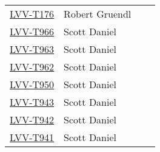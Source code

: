 \documentclass[DM,lsstdraft,STR,toc]{lsstdoc}
\begin{document}
\begin{longtable}{p{3cm}p{3cm}p{3cm}p{6cm}}
\begin{minipage}[]{6cm}
\medskip
\end{minipage}
\\ \hline
\href{https://jira.lsstcorp.org/secure/Tests.jspa#/testCase/LVV-T176}{LVV-T176}
& {\small Robert Gruendl } & {\small  } &
\begin{minipage}[]{6cm}
\smallskip
{\small  }
\medskip
\end{minipage}
\\ \hline
\href{https://jira.lsstcorp.org/secure/Tests.jspa#/testCase/LVV-T966}{LVV-T966}
& {\small Scott Daniel } & {\small  } &
\begin{minipage}[]{6cm}
\smallskip
{\small  }
\medskip
\end{minipage}
\\ \hline
\href{https://jira.lsstcorp.org/secure/Tests.jspa#/testCase/LVV-T963}{LVV-T963}
& {\small Scott Daniel } & {\small  } &
\begin{minipage}[]{6cm}
\smallskip
{\small  }
\medskip
\end{minipage}
\\ \hline
\href{https://jira.lsstcorp.org/secure/Tests.jspa#/testCase/LVV-T962}{LVV-T962}
& {\small Scott Daniel } & {\small  } &
\begin{minipage}[]{6cm}
\smallskip
{\small  }
\medskip
\end{minipage}
\\ \hline
\href{https://jira.lsstcorp.org/secure/Tests.jspa#/testCase/LVV-T950}{LVV-T950}
& {\small Scott Daniel } & {\small  } &
\begin{minipage}[]{6cm}
\smallskip
{\small  }
\medskip
\end{minipage}
\\ \hline
\href{https://jira.lsstcorp.org/secure/Tests.jspa#/testCase/LVV-T943}{LVV-T943}
& {\small Scott Daniel } & {\small  } &
\begin{minipage}[]{6cm}
\smallskip
{\small  }
\medskip
\end{minipage}
\\ \hline
\href{https://jira.lsstcorp.org/secure/Tests.jspa#/testCase/LVV-T942}{LVV-T942}
& {\small Scott Daniel } & {\small  } &
\begin{minipage}[]{6cm}
\smallskip
{\small  }
\medskip
\end{minipage}
\\ \hline
\href{https://jira.lsstcorp.org/secure/Tests.jspa#/testCase/LVV-T941}{LVV-T941}
& {\small Scott Daniel } & {\small  } &
\begin{minipage}[]{6cm}
\smallskip
{\small  }
\medskip
\end{minipage}

\end{longtable}
\end{document}
